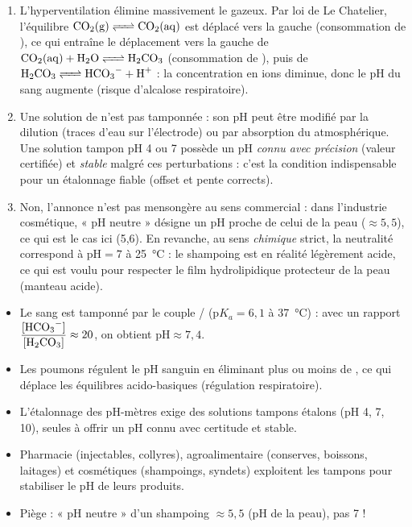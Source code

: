 \documentclass[11pt]{article}
\begin{document}
\begin{corrige}[Exercice]
\begin{enumerate}
\item L'hyperventilation élimine massivement le  gazeux. Par loi de Le Chatelier, l'équilibre $\ce{CO2(g) <=> CO2(aq)}$ est déplacé vers la gauche (consommation de ), ce qui entraîne le déplacement vers la gauche de $\ce{CO2(aq) + H2O <=> H2CO3}$ (consommation de ), puis de $\ce{H2CO3 <=> HCO3- + H+}$ : la concentration en ions  diminue, donc le pH du sang augmente (risque d'alcalose respiratoire).
\item Une solution de  n'est pas tamponnée : son pH peut être modifié par la dilution (traces d'eau sur l'électrode) ou par absorption du  atmosphérique. Une solution tampon pH 4 ou 7 possède un pH \emph{connu avec précision} (valeur certifiée) et \emph{stable} malgré ces perturbations : c'est la condition indispensable pour un étalonnage fiable (offset et pente corrects).
\item Non, l'annonce n'est pas mensongère au sens commercial : dans l'industrie cosmétique, « pH neutre » désigne un pH proche de celui de la peau ($\approx 5,5$), ce qui est le cas ici (5,6). En revanche, au sens \emph{chimique} strict, la neutralité correspond à $\mathrm{pH} = 7$ à \SI{25}{\celsius} : le shampoing est en réalité légèrement acide, ce qui est voulu pour respecter le film hydrolipidique protecteur de la peau (manteau acide).
\end{enumerate}
\end{corrige}

\begin{aretenir}
\begin{itemize}
\item Le sang est tamponné par le couple / ($\mathrm{p}K_a = 6,1$ à \SI{37}{\celsius}) : avec un rapport $\dfrac{[\ce{HCO3-}]}{[\ce{H2CO3}]} \approx 20$, on obtient $\mathrm{pH} \approx 7,4$.
\item Les poumons régulent le pH sanguin en éliminant plus ou moins de , ce qui déplace les équilibres acido-basiques (régulation respiratoire).
\item L'étalonnage des pH-mètres exige des solutions tampons étalons (pH 4, 7, 10), seules à offrir un pH connu avec certitude et stable.
\item Pharmacie (injectables, collyres), agroalimentaire (conserves, boissons, laitages) et cosmétiques (shampoings, syndets) exploitent les tampons pour stabiliser le pH de leurs produits.
\item Piège : « pH neutre » d'un shampoing $\approx 5,5$ (pH de la peau), pas 7 !
\end{itemize}
\end{aretenir}
\end{document}
